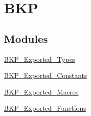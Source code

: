 \hypertarget{group__BKP}{
\section{BKP}
\label{group__BKP}
}
\subsection*{Modules}
\begin{DoxyCompactItemize}
\item 
\hyperlink{group__BKP__Exported__Types}{BKP\_\-Exported\_\-Types}
\item 
\hyperlink{group__BKP__Exported__Constants}{BKP\_\-Exported\_\-Constants}
\item 
\hyperlink{group__BKP__Exported__Macros}{BKP\_\-Exported\_\-Macros}
\item 
\hyperlink{group__BKP__Exported__Functions}{BKP\_\-Exported\_\-Functions}
\end{DoxyCompactItemize}

